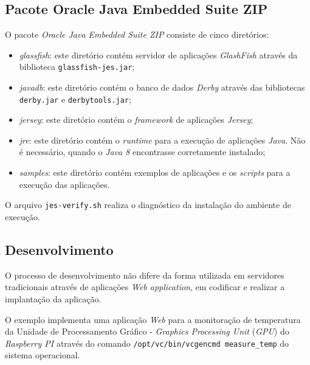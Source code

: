 \subsection{Pacote Oracle Java Embedded Suite ZIP}

O pacote \textit{Oracle Java Embedded Suite ZIP} consiste de cinco diretórios:

\begin{itemize}

    \item \textit{glassfish}: este diretório contém servidor de aplicações
    \textit{GlashFish} através da biblioteca \verb|glassfish-jes.jar|;

    \item \textit{javadb}: este diretório contém o banco de dados
    \textit{Derby} através das bibliotecas \verb|derby.jar| e
    \verb|derbytools.jar|;

    \item \textit{jersey}: este diretório contém o \textit{framework} de
    aplicações \textit{Jersey};

    \item \textit{jre}: este diretório contém o \textit{runtime} para a
    execução de aplicações \textit{Java}. Não é necessário, quando o
    \textit{Java 8} encontrasse corretamente instalado;

    \item \textit{samples}: este diretório contém exemplos de aplicações e os
    \textit{scripts} para a execução das aplicações.

\end{itemize}

O arquivo \verb|jes-verify.sh| realiza o diagnóstico da instalação do ambiente
de execução.

\subsection{Desenvolvimento}

O processo de desenvolvimento não difere da forma utilizada em servidores
tradicionais através de aplicações \textit{Web application}, em codificar e
realizar a implantação da aplicação.

O exemplo implementa uma aplicação \textit{Web} para a monitoração de
temperatura da Unidade de Processamento Gráfico - \textit{Graphics Processing
  Unit} (\textit{GPU}) do \textit{Raspberry PI} através do comando
\verb|/opt/vc/bin/vcgencmd measure_temp| do sistema operacional.

